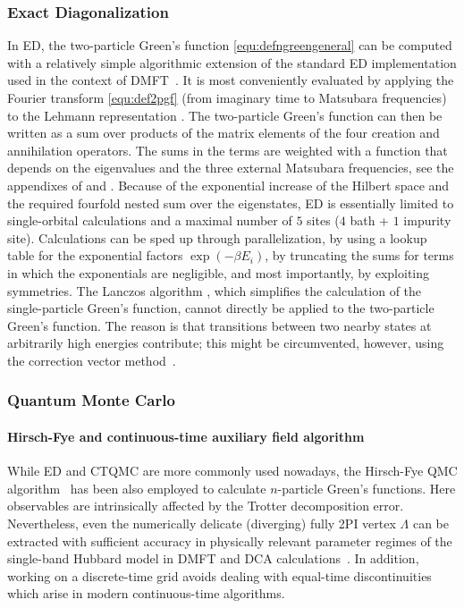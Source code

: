 \documentclass[rmp,aps,reprint,amsmath,amssymb,superscriptaddress,showpacs,nofootinbib]{revtex4-1}
\begin{document}
\subsubsection{Exact Diagonalization}

In ED, the two-particle Green's function \eqref{equ:defngreengeneral} can be computed with a relatively simple algorithmic extension of the standard ED implementation used in the context of DMFT~\cite{Georges1996}. It is most conveniently evaluated by applying the Fourier transform \eqref{equ:def2pgf} (from imaginary time to Matsubara frequencies) to the Lehmann representation \cite{Abrikosov1975,Mahan2000}. The two-particle Green's function can then be written as a sum over products of the matrix elements of the four creation and annihilation operators. The sums in the terms are weighted with a function that depends on the eigenvalues and the three external Matsubara frequencies, see the appendixes of  and .  Because of the exponential increase of the Hilbert space and the required fourfold nested sum over the eigenstates, ED is essentially limited to single-orbital calculations and a maximal number of $5$  sites ($4$ bath + $1$ impurity site). Calculations can be sped up through parallelization, by using a lookup table for the exponential factors $\exp(-\beta E_{i})$, by truncating the sums for terms in which the exponentials are negligible, and most importantly, by exploiting symmetries. The Lanczos algorithm \cite{Georges1996}, which simplifies the calculation of the single-particle Green's function, cannot directly be applied to the two-particle Green's function. The reason is that transitions between two nearby states at arbitrarily high energies contribute; this might be circumvented, however, using the correction vector method~\cite{TanakaPC2016}.

\subsubsection{Quantum Monte Carlo}

\paragraph{Hirsch-Fye and continuous-time auxiliary field algorithm}

While ED and CTQMC are more commonly used nowadays, the Hirsch-Fye QMC algorithm~ \cite{Hirsch1986} has been also employed to calculate $n$-particle Green's functions. Here observables are intrinsically affected by the Trotter decomposition error. Nevertheless, even the numerically  delicate (diverging) fully 2PI vertex $\Lambda$ can be extracted with sufficient accuracy in physically relevant parameter regimes of the single-band Hubbard model in DMFT and DCA calculations~\cite{Maier2006, Gunnarsson2016}. In addition, working on a discrete-time grid avoids dealing with equal-time discontinuities which arise in modern continuous-time algorithms.
\end{document}
